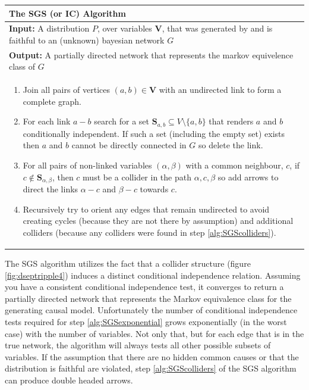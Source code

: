 \documentclass[11pt,a4paper,oneside]{book}
\begin{document}
\begin{table}[H]
 \begin{tabularx}{\textwidth}{X}
 \hline
\rule{0pt}{2.5ex} 
 \textbf{The SGS (or IC) Algorithm}\\
 \hline
 \rule{0pt}{2.5ex}
\textbf{Input:} A distribution $P$, over variables $\boldsymbol{V}$, that was generated by and is faithful to an (unknown) bayesian network $G$\\
\textbf{Output:} A partially directed network that represents the markov equivelence class of $G$\\
 \begin{enumerate}[itemsep=8pt]
  \item Join all pairs of vertices $(a,b) \in \boldsymbol{V}$ with an undirected link to form a complete graph.
  \item For each link $a-b$ search for a set $\boldsymbol{S}_{a,b} \subseteq V \setminus \{a,b\}$ that renders $a$ and $b$ conditionally independent. If such a set (including the empty set) exists then $a$ and $b$ cannot be directly connected in $G$ so delete the link.
  \label{alg:SGSexponential}
  
  \item For all pairs of non-linked variables $(\alpha,\beta)$ with a common neighbour, $c$, if $c \notin \boldsymbol{S}_{\alpha,\beta}$, then $c$ must be a collider in the path $\alpha,c,\beta$ so  add arrows to direct the links $\alpha-c$ and $\beta-c$ towards $c$.
  \label{alg:SGScolliders}  
  \item Recursively try to orient any edges that remain undirected to avoid creating cycles (because they are not there by assumption) and additional colliders (because any colliders were found in step \ref{alg:SGScolliders}).
  \label{alg:SGSfinal}
\end{enumerate}\\
 \hline
\end{tabularx}
\end{table}

The SGS algorithm utilizes the fact that a collider structure (figure \ref{fig:dseptripple4}) induces a distinct conditional independence relation. Assuming you have a consistent conditional independence test, it converges to return a partially directed network that represents the Markov equivalence class for the generating causal model. Unfortunately the number of conditional independence tests required for step \ref{alg:SGSexponential} grows exponentially (in the worst case) with the number of variables. Not only that, but for each edge that is in the true network, the algorithm will always tests all other possible subsets of variables. If the assumption that there are no hidden common causes or that the distribution is faithful are violated, step \ref{alg:SGScolliders} of the SGS algorithm can produce double headed arrows.
\end{document}
